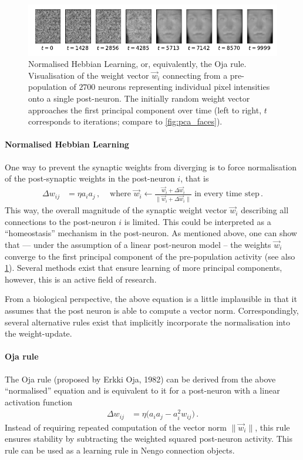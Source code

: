 \documentclass[10pt,letterpaper,oneside]{article}
\begin{document}
\begin{figure}
	\centering
	\includegraphics{media/hebbian_learning_example.pdf}
	\caption{Normalised Hebbian Learning, or, equivalently, the Oja rule. Visualisation of the weight vector $\vec w_i$ connecting from a pre-population of $2700$ neurons representing individual pixel intensities onto a single post-neuron. The initially random weight vector approaches the first principal component over time (left to right, $t$ corresponds to iterations; compare to \cref{fig:pca_faces}). }
	\label{fig:hebbian_learning_example}
\end{figure}

\paragraph{Normalised Hebbian Learning}
One way to prevent the synaptic weights from diverging is to force normalisation of the post-synaptic weights in the post-neuron $i$, that is
\begin{align*}
	\Delta w_{ij} &= \eta a_i a_j \,, & \text{ where } \vec w_{i} \gets \frac{\vec w_i + \Delta \vec w_{i}}{\|\vec w_i + \Delta \vec w_{i}\|} \text{ in every time step}\,.
\end{align*}
This way, the overall magnitude of the synaptic weight vector $\vec w_{i}$ describing all connections to the post-neuron $i$ is limited. This could be interpreted as a \enquote{homeostasis} mechanism in the post-neuron. As mentioned above, one can show that --- under the assumption of a linear post-neuron model -- the weights $\vec w_i$ converge to the first principal component of the pre-population activity (see also \cref{fig:hebbian_learning_example}). Several methods exist that ensure learning of more principal components, however, this is an active field of research.

From a biological perspective, the above equation is a little implausible in that it assumes that the post neuron is able to compute a vector norm. Correspondingly, several alternative rules exist that implicitly incorporate the normalisation into the weight-update.

\paragraph{Oja rule}
The Oja rule (proposed by Erkki Oja, 1982) can be derived from the above \enquote{normalised} equation and is equivalent to it for a post-neuron with a linear activation function
\begin{align*}
\Delta w_{ij} &= \eta \big(a_i a_j - a_i^2 w_{ij}\big) \,.
\end{align*}
Instead of requiring repeated computation of the vector norm $\|\vec w_i\|$, this rule ensures stability by subtracting the weighted squared post-neuron activity. This rule can be used as a learning rule in Nengo connection objects.
\end{document}
